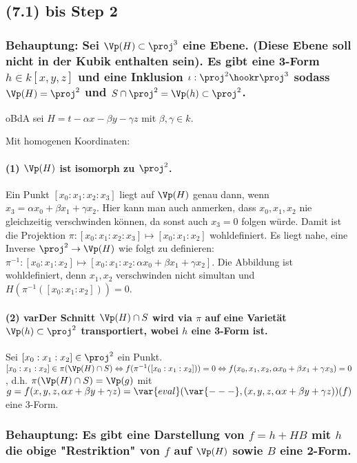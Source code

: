
\subsection{(7.1) bis Step 2}


\subsubsection{%
Behauptung: Sei $\Vp(H) \subset \proj^3$ eine Ebene.
(Diese Ebene soll nicht in der Kubik enthalten sein).
Es gibt eine 3-Form $h \in k[x,y,z]$ und eine Inklusion $\iota : \proj^2 \hookr \proj^3$ sodass $\Vp(H) = \proj^2$ und $S\cap \proj^2 = \Vp(h) \subset \proj^2$.
} %

oBdA sei $H = t - \alpha x -  \beta y - \gamma z$ mit $\beta, \gamma \in k$.

Mit homogenen Koordinaten:
\paragraph{(1) $\Vp(H)$ ist isomorph zu $\proj^2$.}
Ein Punkt $[x_0:x_1:x_2:x_3]$ liegt auf $\Vp(H)$ genau dann, wenn $x_3 = \alpha x_0 + \beta x_1 + \gamma x_2$.
Hier kann man auch anmerken, dass $x_0,x_1,x_2$ nie gleichzeitig verschwinden können, da sonst auch $x_3 = 0$ folgen würde.
Damit ist die Projektion $\pi : [x_0:x_1:x_2:x_3] \mapsto [x_0:x_1:x_2]$ wohldefiniert.
Es liegt nahe, eine Inverse $\proj^2 \to \Vp(H)$ wie folgt zu definieren:
$\pi^{-1} : [x_0:x_1:x_2] \mapsto [x_0 : x_1 : x_2 : \alpha x_0 + \beta x_1 + \gamma x_2]$.
Die Abbildung ist wohldefiniert, denn $x_1,x_2$ verschwinden nicht simultan und $H(\pi^{-1}([x_0:x_1:x_2])) = 0$.

\paragraph{(2) var{Der} Schnitt $\Vp(H) \cap S$ wird via $\pi$ auf eine Varietät $\Vp(h) \subset \proj^2$ transportiert, wobei $h$ eine 3-Form ist.}

Sei $[x_0:x_1:x_2] \in \proj^2$ ein Punkt.
$[x_0:x_1:x_2] \in \pi(\Vp(H)\cap S)
\Leftrightarrow f(\pi^{-1}([x_0:x_1:x_2])) = 0
\Leftrightarrow f(x_0,x_1,x_2,\alpha x_0 + \beta x_1 + \gamma x_3) = 0$, d.h. $\pi(\Vp(H)\cap S) = \Vp(g)$ mit $g=f(x, y, z, \alpha x + \beta y + \gamma z) = \var{eval}(\var{---},(x, y, z, \alpha x + \beta y + \gamma z))(f)$ eine 3-Form.

\subsubsection{%
Behauptung: Es gibt eine Darstellung von $f = h + HB$ mit $h$ die obige "Restriktion" von $f$ auf $\Vp(H)$ sowie $B$ eine 2-Form.
} %


